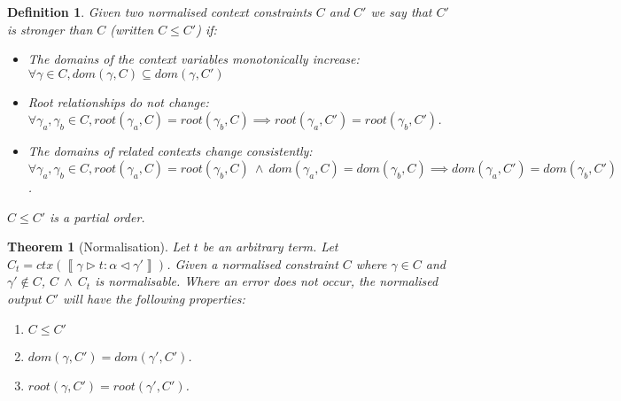 \documentclass[preprint]{sigplanconf}
\newtheorem{thm}{Theorem}
\newtheorem{defn}{Definition}
\newcommand{\inferlhs}[1]{\left\llbracket \gamma \triangleright #1 : \alpha \triangleleft \gamma' \right\rrbracket}
\newcommand{\cand}{\:\wedge\:}
\begin{document}
\begin{defn}
Given two normalised context constraints $C$ and $C'$ we say that
$C'$ is {\it stronger} than $C$ (written $C \leq C'$) if:

\begin{itemize}
\item The domains of the context variables monotonically increase: 
$\forall \gamma \in C, dom(\gamma, C) \subseteq dom(\gamma, C')$
\item Root relationships do not change: 
$\forall \gamma_a, \gamma_b \in C, root(\gamma_a, C) = root(\gamma_b, C) \implies root(\gamma_a, C') = root(\gamma_b, C')$.
\item The domains of related contexts change consistently:
$\forall \gamma_a, \gamma_b \in C, root(\gamma_a, C) = root(\gamma_b, C) \cand dom(\gamma_a, C) = dom(\gamma_b, C) \implies dom(\gamma_a, C') = dom(\gamma_b, C')$.
\end{itemize}

$C \leq C'$ is a partial order.

\end{defn}


\begin{thm}[Normalisation]
\label{thm:ctx_norm}
Let $t$ be an arbitrary term. Let $C_t = ctx(\inferlhs{t})$.
Given a normalised constraint $C$ where $\gamma \in C$ and $\gamma' \notin C$,
$C \cand C_t$ is normalisable. Where an error does not occur, the normalised
output $C'$ will have the following properties:

\begin{enumerate}
\item $C \leq C'$
\item $dom(\gamma, C') = dom(\gamma', C')$.
\item $root(\gamma, C') = root(\gamma', C')$.
\end{enumerate}

\end{thm}
\end{document}
